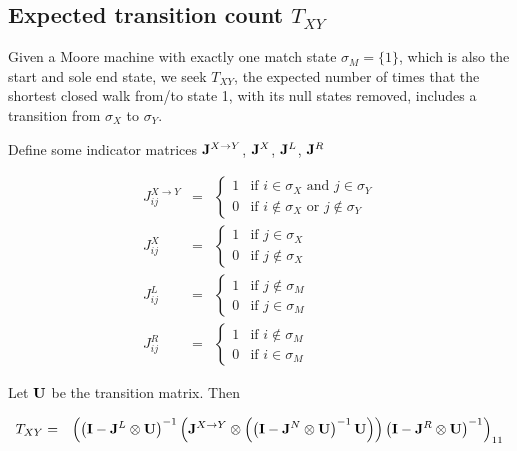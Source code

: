 \documentclass{article}
\begin{document}
\subsection{Expected transition count $T_{XY}$}

Given a Moore machine with exactly one match state $\sigma_M = \{ 1 \}$, which is also the start and sole end state,
we seek $T_{XY}$, the expected number of times that the shortest closed walk from/to state 1,
with its null states removed, includes a transition from $\sigma_X$ to $\sigma_Y$.

\newcommand\nottomatch{L}
\newcommand\notfrommatch{R}
\newcommand\tox{X}
\newcommand\tonull{N}
\newcommand\xtoy{{X \to Y}}

Define some indicator matrices
${\bf J}^\xtoy$,
${\bf J}^\tox$,
${\bf J}^\nottomatch$,
${\bf J}^\notfrommatch$

\begin{eqnarray*}
  J^\xtoy_{ij} & = & \left\{ \begin{array}{ll} 1 & \mbox{if $i \in \sigma_X$ and $j \in \sigma_Y$} \\ 0 & \mbox{if $i \notin \sigma_X$ or $j \notin \sigma_Y$} \end{array} \right. \\
  J^\tox_{ij} & = & \left\{ \begin{array}{ll} 1 & \mbox{if $j \in \sigma_X$} \\ 0 & \mbox{if $j \notin \sigma_X$} \end{array} \right. \\
  J^\nottomatch_{ij} & = & \left\{ \begin{array}{ll} 1 & \mbox{if $j \notin \sigma_M$} \\ 0 & \mbox{if $j \in \sigma_M$} \end{array} \right. \\
  J^\notfrommatch_{ij} & = & \left\{ \begin{array}{ll} 1 & \mbox{if $i \notin \sigma_M$} \\ 0 & \mbox{if $i \in \sigma_M$} \end{array} \right.
\end{eqnarray*}

Let ${\bf U}$ be the transition matrix.
Then

\begin{eqnarray*}
T_{XY} & = &
\left(
\left( {\bf I} - {\bf J}^\nottomatch \otimes {\bf U} \right)^{-1}
\left(
     {\bf J}^\xtoy \otimes
     \left(
     \left( {\bf I} - {\bf J}^\tonull \otimes {\bf U} \right)^{-1}
          {\bf U}
     \right)
\right)
\left( {\bf I} - {\bf J}^\notfrommatch \otimes {\bf U} \right)^{-1}
\right)_{11}
\end{eqnarray*}
\end{document}
